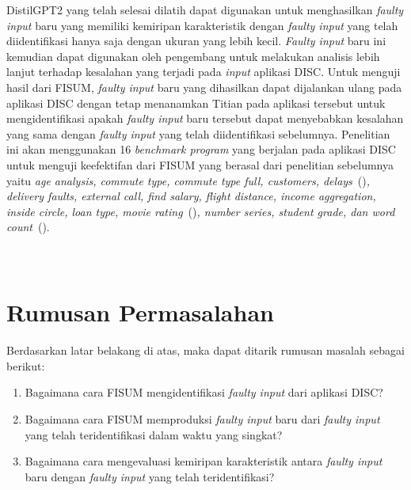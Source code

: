 DistilGPT2 yang telah selesai dilatih dapat digunakan
untuk menghasilkan \emph{faulty input} baru yang
memiliki kemiripan karakteristik dengan \emph{faulty input}
yang telah diidentifikasi hanya saja dengan ukuran
yang lebih kecil. \emph{Faulty input} baru ini kemudian dapat
digunakan oleh pengembang untuk melakukan analisis
lebih lanjut terhadap kesalahan yang terjadi pada \emph{input} aplikasi
DISC. Untuk menguji hasil dari FISUM, \emph{faulty input} 
baru yang dihasilkan dapat dijalankan ulang pada aplikasi DISC
dengan tetap menanamkan Titian pada aplikasi tersebut untuk
mengidentifikasi apakah \emph{faulty input} baru tersebut
dapat menyebabkan kesalahan yang sama dengan \emph{faulty input}
yang telah diidentifikasi sebelumnya. Penelitian ini
akan menggunakan 16 \emph{benchmark program} yang berjalan
pada aplikasi DISC untuk menguji keefektifan dari FISUM
yang berasal dari penelitian 
sebelumnya yaitu \emph{age analysis, commute type, commute type full,
customers, delays}~(\cite{gulzar2019})\emph{, delivery faults, external call,
find salary, flight distance, income aggregation,
inside circle, loan type, movie rating}~(\cite{humayun2023})\emph{, 
number series, student grade, dan
word count}~(\cite{zhang2021}).
\\
\\
\\


\section{Rumusan Permasalahan}
\label{sec:permasalahan}

Berdasarkan latar belakang di atas, maka dapat ditarik rumusan masalah sebagai berikut:

\begin{enumerate}[nolistsep]

   \item Bagaimana cara FISUM mengidentifikasi \emph{faulty input} dari aplikasi DISC?

   \item Bagaimana cara FISUM memproduksi \emph{faulty input} baru dari \emph{faulty input} yang telah teridentifikasi dalam waktu yang singkat?

   \item Bagaimana cara mengevaluasi kemiripan karakteristik antara \emph{faulty input} baru dengan \emph{faulty input} yang telah teridentifikasi?

\end{enumerate}

